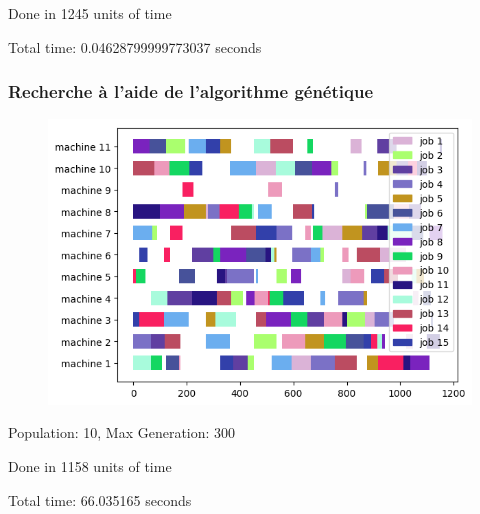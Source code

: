 Done in 1245 units of time

Total time: 0.04628799999773037 seconds 
\frameboxend

\newpage

\subsubsection{Recherche à l'aide de l'algorithme génétique}

\begin{figure}[!h]
    \centering
    \includegraphics[]{results/barnes_setb4c9_genetic.png}
\end{figure}

Population: 10, Max Generation: 300

Done in 1158 units of time

Total time: 66.035165 seconds
\frameboxend